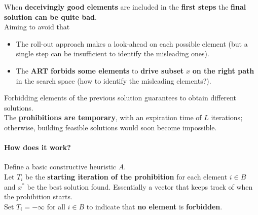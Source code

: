 \documentclass[11pt]{article}
\begin{document}
	When \textbf{deceivingly good elements} are included in the \textbf{first steps} the \textbf{final solution can be quite bad}.\\
	
	Aiming to avoid that
	\begin{itemize}
		\item The roll-out approach makes a look-ahead on each possible element (but a single step can be insufficient to identify the misleading ones).\\
		
		\item The \textbf{ART forbids some elements} to \textbf{drive subset} $x$ \textbf{on the right path} in the search space (how to identify the misleading elements?).\\
	\end{itemize}
	
	Forbidding elements of the previous solution guarantees to obtain different solutions.\\
	
	The \textbf{prohibitions are temporary}, with an expiration time of $L$ iterations; otherwise, building feasible solutions would soon become impossible.\\
	
	\newpage
	
	\paragraph{How does it work?} Define a basic constructive heuristic $A$.\\
	
	Let $T_i$ be the \textbf{starting iteration of the prohibition} for each element $i \in B$ and $x^\ast$ be the best solution found. Essentially a vector that keeps track of when the prohibition starts.\\
	
	Set $T_i = −\infty$ for all $i \in B$ to indicate that \textbf{no element} is \textbf{forbidden}.\\
	
\end{document}

